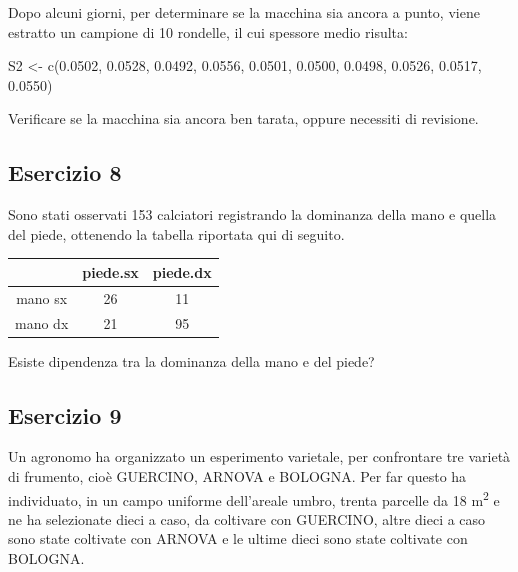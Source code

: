 \documentclass[a4paper,12pt,oneside]{book}
\newenvironment{Shaded}{\begin{snugshade}}{\end{snugshade}}
\newcommand{\FloatTok}[1]{#1}
\newcommand{\OtherTok}[1]{#1}
\newcommand{\FunctionTok}[1]{#1}
\newcommand{\NormalTok}[1]{#1}
\begin{document}
Dopo alcuni giorni, per determinare se la macchina sia ancora a punto, viene estratto un campione di 10 rondelle, il cui spessore medio risulta:

\begin{Shaded}
\begin{Highlighting}[]
\NormalTok{S2 }\OtherTok{\textless{}{-}} \FunctionTok{c}\NormalTok{(}\FloatTok{0.0502}\NormalTok{, }\FloatTok{0.0528}\NormalTok{, }\FloatTok{0.0492}\NormalTok{, }\FloatTok{0.0556}\NormalTok{, }\FloatTok{0.0501}\NormalTok{, }\FloatTok{0.0500}\NormalTok{, }\FloatTok{0.0498}\NormalTok{,}
        \FloatTok{0.0526}\NormalTok{, }\FloatTok{0.0517}\NormalTok{, }\FloatTok{0.0550}\NormalTok{)}
\end{Highlighting}
\end{Shaded}

Verificare se la macchina sia ancora ben tarata, oppure necessiti di revisione.

\hypertarget{esercizio-8-1}{%
\subsection{Esercizio 8}\label{esercizio-8-1}}

Sono stati osservati 153 calciatori registrando la dominanza della mano e quella del piede, ottenendo la tabella riportata qui di seguito.

\begin{longtable}[]{@{}ccc@{}}
\toprule
& piede.sx & piede.dx \\
\midrule
\endhead
mano sx & 26 & 11 \\
mano dx & 21 & 95 \\
\bottomrule
\end{longtable}

Esiste dipendenza tra la dominanza della mano e del piede?

\hypertarget{esercizio-9-1}{%
\subsection{Esercizio 9}\label{esercizio-9-1}}

Un agronomo ha organizzato un esperimento varietale, per confrontare tre varietà di frumento, cioè GUERCINO, ARNOVA e BOLOGNA. Per far questo ha individuato, in un campo uniforme dell'areale umbro, trenta parcelle da 18 m\textsuperscript{2} e ne ha selezionate dieci a caso, da coltivare con GUERCINO, altre dieci a caso sono state coltivate con ARNOVA e le ultime dieci sono state coltivate con BOLOGNA.
\end{document}
